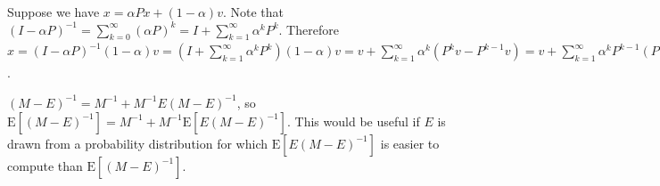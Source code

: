 \documentclass{article}
\newcommand \E[1] {\mathrm E \left[#1\right]} %
\newcommand \inv [1] {{#1}^{-1}} %
\begin{document}
Suppose we have $x=\alpha Px + (1-\alpha)v$. Note that $\inv{(I-\alpha P)} = \sum_{k=0}^\infty (\alpha P)^k = I+\sum_{k=1}^\infty \alpha^k P^k$. Therefore $x=\inv{(I-\alpha P)}(1-\alpha)v = (I+\sum_{k=1}^\infty \alpha^k P^k)(1-\alpha)v = v+\sum_{k=1}^\infty \alpha^k (P^k v -P^{k-1}v) = v+\sum_{k=1}^\infty \alpha^k P^{k-1} (P-I)v = \left( I+\sum_{k=1}^\infty (\alpha^k P^{k-1}) (P-I)\right)v = (I+\alpha(I-\alpha P)^{-1})(P-I)v$.

$(M-E)^{-1} = \inv M + \inv M E (M-E)^{-1}$, so $\E{(M-E)^{-1}} = \inv M + \inv M \E{E(M-E)^{-1}}$. This would be useful if $E$ is drawn from a probability distribution for which $\E{E(M-E)^{-1}}$ is easier to compute than $\E{(M-E)^{-1}}$.
\end{document}
